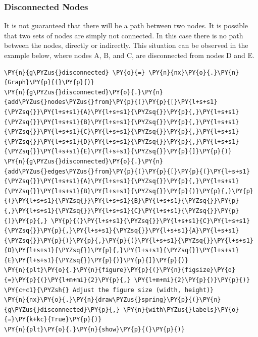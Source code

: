     \hypertarget{disconnected-nodes}{%
\subsubsection{Disconnected Nodes}\label{disconnected-nodes}}

It is not guaranteed that there will be a path between two nodes. It is
possible that two sets of nodes are simply not connected. In this case
there is no path between the nodes, directly or indirectly. This
situation can be observed in the example below, where nodes A, B, and C,
are disconnected from nodes D and E.

    \begin{tcolorbox}[breakable, size=fbox, boxrule=1pt, pad at break*=1mm,colback=cellbackground, colframe=cellborder]
\begin{Verbatim}[commandchars=\\\{\}]
\PY{n}{g\PYZus{}disconnected} \PY{o}{=} \PY{n}{nx}\PY{o}{.}\PY{n}{Graph}\PY{p}{(}\PY{p}{)}
\PY{n}{g\PYZus{}disconnected}\PY{o}{.}\PY{n}{add\PYZus{}nodes\PYZus{}from}\PY{p}{(}\PY{p}{[}\PY{l+s+s1}{\PYZsq{}}\PY{l+s+s1}{A}\PY{l+s+s1}{\PYZsq{}}\PY{p}{,}\PY{l+s+s1}{\PYZsq{}}\PY{l+s+s1}{B}\PY{l+s+s1}{\PYZsq{}}\PY{p}{,}\PY{l+s+s1}{\PYZsq{}}\PY{l+s+s1}{C}\PY{l+s+s1}{\PYZsq{}}\PY{p}{,}\PY{l+s+s1}{\PYZsq{}}\PY{l+s+s1}{D}\PY{l+s+s1}{\PYZsq{}}\PY{p}{,}\PY{l+s+s1}{\PYZsq{}}\PY{l+s+s1}{E}\PY{l+s+s1}{\PYZsq{}}\PY{p}{]}\PY{p}{)}
\PY{n}{g\PYZus{}disconnected}\PY{o}{.}\PY{n}{add\PYZus{}edges\PYZus{}from}\PY{p}{(}\PY{p}{[}\PY{p}{(}\PY{l+s+s1}{\PYZsq{}}\PY{l+s+s1}{A}\PY{l+s+s1}{\PYZsq{}}\PY{p}{,}\PY{l+s+s1}{\PYZsq{}}\PY{l+s+s1}{B}\PY{l+s+s1}{\PYZsq{}}\PY{p}{)}\PY{p}{,}\PY{p}{(}\PY{l+s+s1}{\PYZsq{}}\PY{l+s+s1}{B}\PY{l+s+s1}{\PYZsq{}}\PY{p}{,}\PY{l+s+s1}{\PYZsq{}}\PY{l+s+s1}{C}\PY{l+s+s1}{\PYZsq{}}\PY{p}{)}\PY{p}{,} \PY{p}{(}\PY{l+s+s1}{\PYZsq{}}\PY{l+s+s1}{C}\PY{l+s+s1}{\PYZsq{}}\PY{p}{,}\PY{l+s+s1}{\PYZsq{}}\PY{l+s+s1}{A}\PY{l+s+s1}{\PYZsq{}}\PY{p}{)}\PY{p}{,}\PY{p}{(}\PY{l+s+s1}{\PYZsq{}}\PY{l+s+s1}{D}\PY{l+s+s1}{\PYZsq{}}\PY{p}{,}\PY{l+s+s1}{\PYZsq{}}\PY{l+s+s1}{E}\PY{l+s+s1}{\PYZsq{}}\PY{p}{)}\PY{p}{]}\PY{p}{)}
\PY{n}{plt}\PY{o}{.}\PY{n}{figure}\PY{p}{(}\PY{n}{figsize}\PY{o}{=}\PY{p}{(}\PY{l+m+mi}{2}\PY{p}{,} \PY{l+m+mi}{2}\PY{p}{)}\PY{p}{)}  \PY{c+c1}{\PYZsh{} Adjust the figure size (width, height)}
\PY{n}{nx}\PY{o}{.}\PY{n}{draw\PYZus{}spring}\PY{p}{(}\PY{n}{g\PYZus{}disconnected}\PY{p}{,} \PY{n}{with\PYZus{}labels}\PY{o}{=}\PY{k+kc}{True}\PY{p}{)}
\PY{n}{plt}\PY{o}{.}\PY{n}{show}\PY{p}{(}\PY{p}{)}
\end{Verbatim}
\end{tcolorbox}

